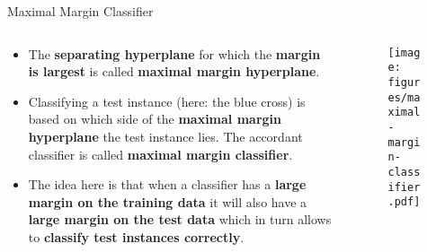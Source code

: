 \documentclass[document.tex]{subfiles}
\begin{document}
    \begin{frame}{Maximal Margin Classifier}
		\begin{columns}
			\begin{column}{0.6\textwidth}
				\begin{itemize}
					\item The \textbf{separating hyperplane} for which the \textbf{margin is largest} is called \textbf{maximal margin hyperplane}.
					\item Classifying a test instance (here: the blue cross) is based on which side of the \textbf{maximal margin hyperplane} the test instance lies. The accordant classifier is called \textbf{maximal margin classifier}. 
					\item The idea here is that when a classifier has a \textbf{large margin on the training data} it will also have a \textbf{large margin on the test data} which in turn allows to \textbf{classify test instances correctly}.
				\end{itemize}
			\end{column}
			\begin{column}{0.4\textwidth}
				\begin{figure}
					\label{fig:maximal-margin-classifier}
                    \texttt{[image: figures/maximal-margin-classifier.pdf]}
				\end{figure}
			\end{column}
		\end{columns}
	\end{frame}
\end{document}

